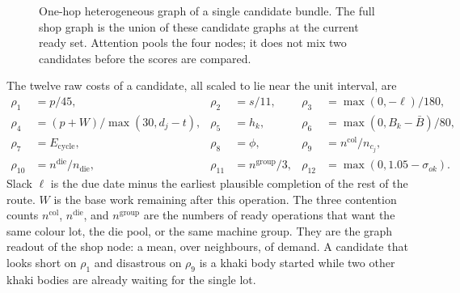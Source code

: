 \begin{figure}[ht]
\centering
{}
\caption{One-hop heterogeneous graph of a single candidate bundle. The full shop graph is the union of these candidate graphs at the current ready set. Attention pools the four nodes; it does not mix two candidates before the scores are compared.}
\label{fig:rch-graph}
\end{figure}

The twelve raw costs of a candidate, all scaled to lie near the unit interval, are
\begin{align}
\rho_1 &= p/45, &
\rho_2 &= s/11, &
\rho_3 &= \max(0,-\ell)/180, \label{eq:raw1}\\
\rho_4 &= (p + W)/ \max(30, d_j - t), &
\rho_5 &= h_k, &
\rho_6 &= \max(0, B_k - \bar B)/80, \label{eq:raw2}\\
\rho_7 &= E_{\mathrm{cycle}}, &
\rho_8 &= \phi, &
\rho_9 &= n^{\mathrm{col}} / n_{c_j}, \label{eq:raw3}\\
\rho_{10} &= n^{\mathrm{die}} / n_{\mathrm{die}}, &
\rho_{11} &= n^{\mathrm{group}}/3, &
\rho_{12} &= \max(0, 1.05 - \sigma_{ok}) . \label{eq:raw4}
\end{align}
Slack \(\ell\) is the due date minus the earliest plausible completion of the rest of the route. \(W\) is the base work remaining after this operation. The three contention counts \(n^{\mathrm{col}}\), \(n^{\mathrm{die}}\), and \(n^{\mathrm{group}}\) are the numbers of ready operations that want the same colour lot, the die pool, or the same machine group. They are the graph readout of the shop node: a mean, over neighbours, of demand. A candidate that looks short on \(\rho_1\) and disastrous on \(\rho_9\) is a khaki body started while two other khaki bodies are already waiting for the single lot.

